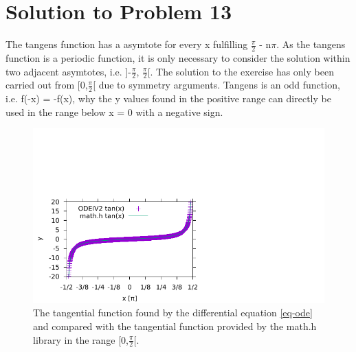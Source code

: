 \documentclass[twocolumn]{article}
\begin{document}
\section{Solution to Problem 13}

The tangens function has a asymtote for every x fulfilling $\frac{\pi}{2}$ - n$\pi$. As the tangens function is a periodic function, it is only necessary to consider the solution within two adjacent asymtotes, i.e. ]-$\frac{\pi}{2}$, $\frac{\pi}{2}$[. The solution to the exercise has only been carried out from [0,$\frac{\pi}{2}$[ due to symmetry arguments. Tangens is an odd function, i.e. f(-x) = -f(x), why the y values found in the positive range can directly be used in the range below x = 0 with a negative sign.

\begin{figure}[h]
\includegraphics{plot.pdf}
\caption{The tangential function found by the differential equation \ref{eq-ode} and compared with the tangential function provided by the math.h library in the range [0,$\frac{\pi}{2}$[.}
\label{fig-tan}
\end{figure}
\end{document}
